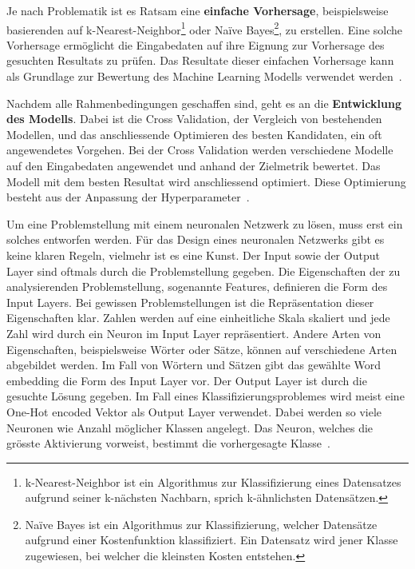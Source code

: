 Je nach Problematik ist es Ratsam eine \textbf{einfache Vorhersage}, beispielsweise basierenden auf k-Nearest-Neighbor\footnote{k-Nearest-Neighbor ist ein Algorithmus zur Klassifizierung eines Datensatzes aufgrund seiner k-nächsten Nachbarn, sprich k-ähnlichsten Datensätzen.} oder Naïve Bayes\footnote{Naïve Bayes ist ein Algorithmus zur Klassifizierung, welcher Datensätze aufgrund einer Kostenfunktion klassifiziert. Ein Datensatz wird jener Klasse zugewiesen, bei welcher die kleinsten Kosten entstehen.}, zu erstellen. Eine solche Vorhersage ermöglicht die Eingabedaten auf ihre Eignung zur Vorhersage des gesuchten Resultats zu prüfen. Das Resultate dieser einfachen Vorhersage kann als Grundlage zur Bewertung des Machine Learning Modells verwendet werden~\autocite{DesignMLSecondaryCite}.

Nachdem alle Rahmenbedingungen geschaffen sind, geht es an die \textbf{Entwicklung des Modells}. Dabei ist die Cross Validation, der Vergleich von bestehenden Modellen, und das anschliessende Optimieren des besten Kandidaten, ein oft angewendetes Vorgehen. Bei der Cross Validation werden verschiedene Modelle auf den Eingabedaten angewendet und anhand der Zielmetrik bewertet. Das Modell mit dem besten Resultat wird anschliessend optimiert. Diese Optimierung besteht aus der Anpassung der Hyperparameter~\autocite{DesignML}.

Um eine Problemstellung mit einem neuronalen Netzwerk zu lösen, muss erst ein solches entworfen werden. Für das Design eines neuronalen Netzwerks gibt es keine klaren Regeln, vielmehr ist es eine Kunst. Der Input sowie der Output Layer sind oftmals durch die Problemstellung gegeben. Die Eigenschaften der zu analysierenden Problemstellung, sogenannte Features, definieren die Form des Input Layers. Bei gewissen Problemstellungen ist die Repräsentation dieser Eigenschaften klar. Zahlen werden auf eine einheitliche Skala skaliert und jede Zahl wird durch ein Neuron im Input Layer repräsentiert. Andere Arten von Eigenschaften, beispielsweise Wörter oder Sätze, können auf verschiedene Arten abgebildet werden. Im Fall von Wörtern und Sätzen gibt das gewählte Word embedding die Form des Input Layer vor. Der Output Layer ist durch die gesuchte Lösung gegeben. Im Fall eines Klassifizierungsproblemes wird meist eine One-Hot encoded Vektor als Output Layer verwendet. Dabei werden so viele Neuronen wie Anzahl möglicher Klassen angelegt. Das Neuron, welches die grösste Aktivierung vorweist, bestimmt die vorhergesagte Klasse~\autocite{NNDesign}.

